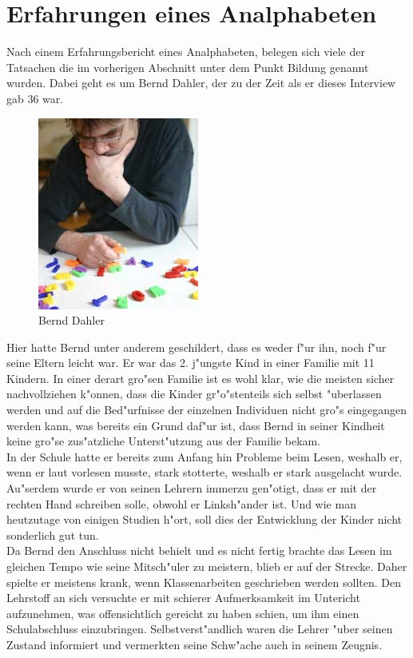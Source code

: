 \section{Erfahrungen eines Analphabeten}


Nach einem Erfahrungsbericht eines Analphabeten, belegen sich viele der Tatsachen die im vorherigen Abschnitt unter dem Punkt Bildung genannt wurden. Dabei geht es um Bernd Dahler, der zu der Zeit als er dieses Interview gab 36 war.\\


\begin{figure}[h]
	\centering
		\includegraphics[scale=0.80]{Daten/BerndDahler.jpg}
	\caption{Bernd Dahler}
	\label{fig:BerndDahler}
\end{figure}



Hier hatte Bernd unter anderem geschildert, dass es weder f"ur ihn, noch f"ur seine Eltern leicht war. Er war das 2. j"ungste Kind in einer Familie mit 11 Kindern. In einer derart gro"sen Familie ist es wohl klar, wie die meisten sicher nachvollziehen k"onnen, dass die Kinder gr"o"stenteils sich selbst "uberlassen werden und auf die Bed"urfnisse der einzelnen Individuen nicht gro"s eingegangen werden kann, was bereits ein Grund daf"ur ist, dass Bernd in seiner Kindheit keine gro"se zus"atzliche Unterst"utzung aus der Familie bekam.\\

In der Schule hatte er bereits zum Anfang hin Probleme beim Lesen, weshalb er, wenn er laut vorlesen musste, stark stotterte, weshalb er stark ausgelacht wurde. Au"serdem wurde er von seinen Lehrern immerzu gen"otigt, dass er mit der rechten Hand schreiben solle, obwohl er Linksh"ander ist. Und wie man heutzutage von einigen Studien h"ort, soll dies der Entwicklung der Kinder nicht sonderlich gut tun.\\

Da Bernd den Anschluss nicht behielt und es nicht fertig brachte das Lesen im gleichen Tempo wie seine Mitsch"uler zu meistern, blieb er auf der Strecke. Daher spielte er meistens krank, wenn Klassenarbeiten geschrieben werden sollten. Den Lehrstoff an sich versuchte er mit schierer Aufmerksamkeit im Untericht aufzunehmen, was offensichtlich gereicht zu haben schien, um ihm einen Schulabschluss einzubringen. Selbstverst"andlich waren die Lehrer "uber seinen Zustand informiert und vermerkten seine Schw"ache auch in seinem Zeugnis.\\

